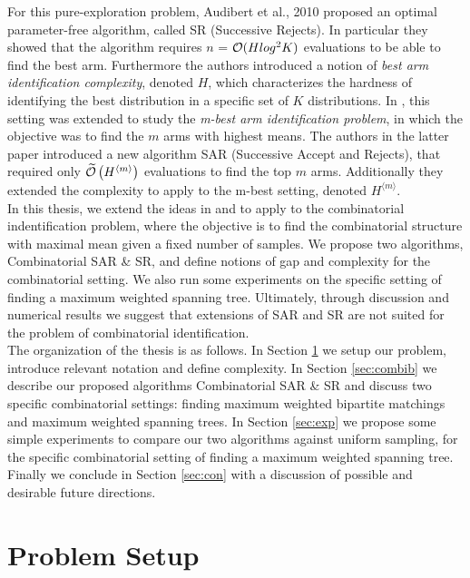 \documentclass[11.75pt,oneside]{amsart}
\begin{document}
For this pure-exploration problem, Audibert et al., 2010 \cite{ABM10} proposed an optimal parameter-free algorithm, called SR (Successive Rejects). In particular they showed that the algorithm requires $n$ = $\mathcal{O}{(Hlog^2 K)}$ evaluations to be able to find the best arm. Furthermore the authors introduced a notion of \emph{best arm identification complexity}, denoted $H$, which characterizes the hardness of identifying the best distribution in a specific set of $K$ distributions. In \cite{BWV13}, this setting was extended to study the \emph{m-best arm identification problem}, in which the objective was to find the $m$ arms with highest means. The authors in the latter paper introduced a new algorithm SAR (Successive Accept and Rejects), that required only $\widetilde{\mathcal{O}}\left(H^{\langle m \rangle}\right)$ evaluations to find the top $m$ arms. Additionally they extended the complexity to apply to the m-best setting, denoted $H^{\langle m \rangle}$.\\

In this thesis, we extend the ideas in \cite{ABM10} and \cite{BWV13} to apply to the combinatorial indentification problem, where the objective is to find the combinatorial structure with maximal mean given a fixed number of samples. We propose two algorithms, Combinatorial SAR \& SR, and define notions of gap and complexity for the combinatorial setting. We also run some experiments on the specific setting of finding a maximum weighted spanning tree. Ultimately, through discussion and numerical results we suggest that extensions of SAR and SR are not suited for the problem of combinatorial identification.\\ 

The organization of the thesis is as follows. In Section \ref{sec:setup} we setup our problem, introduce relevant notation and define complexity. In Section \ref{sec:combib} we describe our proposed algorithms Combinatorial SAR \& SR and discuss two specific combinatorial settings: finding maximum weighted bipartite matchings and maximum weighted spanning trees. In Section \ref{sec:exp} we propose some simple experiments to compare our two algorithms against uniform sampling, for the specific combinatorial setting of finding a maximum weighted spanning tree. Finally we conclude in Section \ref{sec:con} with a discussion of possible and desirable future directions.\\

\section{Problem Setup} \label{sec:setup}
\end{document}
